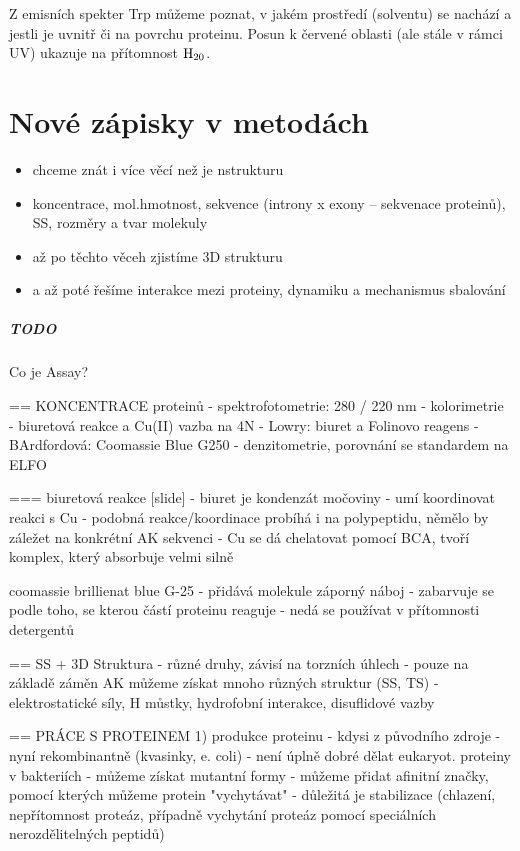 \documentclass[DIV=8]{scrreprt}
\newcommand{\mybox}[2]{
    \paragraph{#1} #2
}
\begin{document}
Z emisních spekter Trp můžeme poznat, v jakém prostředí (solventu) se nachází a jestli je uvnitř či na povrchu proteinu. Posun k červené oblasti (ale stále v rámci UV) ukazuje na přítomnost \(\ce{H20}\).

\chapter{Nové zápisky v metodách} \label{Nové zápisky v metodách}


\begin{itemize}[nosep]
    \item chceme znát i více věcí než je nstrukturu
    \item koncentrace, mol.hmotnost, sekvence (introny x exony -- sekvenace proteinů), SS, rozměry a tvar molekuly
    \item až po těchto věceh zjistíme 3D strukturu
    \item a až poté řešíme interakce mezi proteiny, dynamiku a mechanismus sbalování
\end{itemize}



\mybox{TODO}{Co je Assay?}


== KONCENTRACE proteinů
- spektrofotometrie: 280 / 220 nm
- kolorimetrie
    - biuretová reakce a Cu(II) vazba na 4N
    - Lowry: biuret a Folinovo reagens
    - BArdfordová: Coomassie Blue G250
- denzitometrie, porovnání se standardem na ELFO

=== biuretová reakce [slide]
- biuret je kondenzát močoviny
- umí koordinovat reakci s Cu
    - podobná reakce/koordinace probíhá i na polypeptidu, němělo by záležet na konkrétní AK sekvenci
- Cu se dá chelatovat pomocí BCA, tvoří komplex, který absorbuje velmi silně

coomassie brillienat blue G-25
- přidává molekule záporný náboj
- zabarvuje se podle toho, se kterou částí proteinu reaguje
    - nedá se používat v přítomnosti detergentů

== SS + 3D Struktura
- různé druhy, závisí na torzních úhlech
- pouze na základě záměn AK můžeme získat mnoho různých struktur (SS, TS)
- elektrostatické síly, H můstky, hydrofobní interakce, disuflidové vazby

== PRÁCE S PROTEINEM
1) produkce proteinu
- kdysi z původního zdroje
- nyní rekombinantně (kvasinky, e. coli)
    - není úplně dobré dělat eukaryot. proteiny v bakteriích
    - můžeme získat mutantní formy
    - můžeme přidat afinitní značky, pomocí kterých můžeme protein "vychytávat"
- důležitá je stabilizace (chlazení, nepřítomnost proteáz, případně vychytání proteáz pomocí speciálních nerozdělitelných peptidů)
\end{document}
